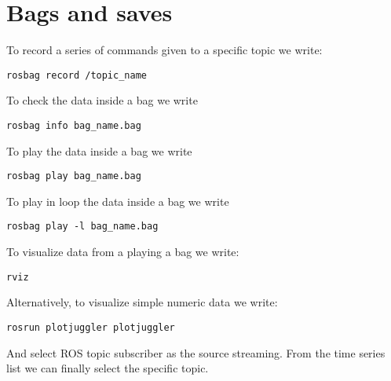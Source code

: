 \section{Bags and saves}

To record a series of commands given to a specific topic we write: 
\begin{verbatim}
rosbag record /topic_name
\end{verbatim}

To check the data inside a bag we write 
\begin{verbatim}
rosbag info bag_name.bag
\end{verbatim}

To play the data inside a bag we write 
\begin{verbatim}
rosbag play bag_name.bag
\end{verbatim}

To play in loop the data inside a bag we write 
\begin{verbatim}
rosbag play -l bag_name.bag
\end{verbatim}

To visualize data from a playing a bag we write: 
\begin{verbatim}
rviz
\end{verbatim}
Alternatively, to visualize simple numeric data we write: 
\begin{verbatim}
rosrun plotjuggler plotjuggler
\end{verbatim}
And select ROS topic subscriber as the source streaming. 
From the time series list we can finally select the specific topic. 